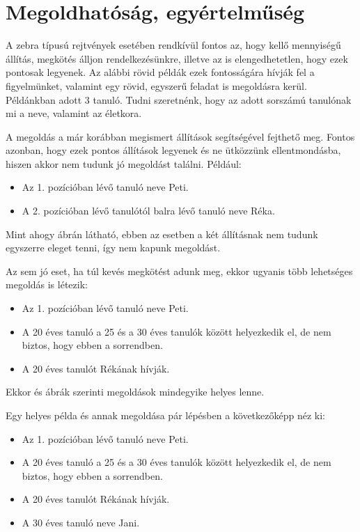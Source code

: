 \documentclass[12pt,a4paper,oneside]{report}
\begin{document}


    \section{Megoldhatóság, egyértelműség} %

A zebra típusú rejtvények esetében rendkívül fontos az, hogy kellő mennyiségű állítás, megkötés álljon rendelkezésünkre, illetve az is elengedhetetlen, hogy ezek pontosak legyenek. 
Az alábbi rövid példák ezek fontosságára hívják fel a figyelmünket, valamint egy rövid, egyszerű feladat is megoldásra kerül.
Példánkban adott 3 tanuló. 
Tudni szeretnénk, hogy az adott sorszámú tanulónak mi a neve, valamint az életkora.

A megoldás a már korábban megismert állítások segítségével fejthető meg. 
Fontos azonban, hogy ezek pontos állítások legyenek és ne ütközzünk ellentmondásba, hiszen akkor nem tudunk jó megoldást találni. 
Például:
\begin{itemize}
\item Az 1. pozícióban lévő tanuló neve Peti.
\item A 2. pozícióban lévő tanulótól balra lévő tanuló neve Réka.
\end{itemize}

Mint ahogy  ábrán látható, ebben az esetben a két állításnak nem tudunk egyszerre eleget tenni, így nem kapunk megoldást.


Az sem jó eset, ha túl kevés megkötést adunk meg, ekkor ugyanis több lehetséges megoldás is létezik:
\begin{itemize}
\item Az 1. pozícióban lévő tanuló neve Peti.
\item A 20 éves tanuló a 25 és a 30 éves tanulók között helyezkedik el, de nem biztos, hogy ebben a sorrendben.
\item A 20 éves tanulót Rékának hívják.
\end{itemize}

Ekkor   és  ábrák szerinti megoldások mindegyike helyes lenne.




Egy helyes példa és annak megoldása pár lépésben a következőképp néz ki:
\begin{itemize}
\item Az 1. pozícióban lévő tanuló neve Peti.
\item A 20 éves tanuló a 25 és a 30 éves tanulók között helyezkedik el, de nem biztos, hogy ebben a sorrendben.
\item A 20 éves tanulót Rékának hívják.
\item A 30 éves tanuló neve Jani.
\end{itemize}
\end{document}
